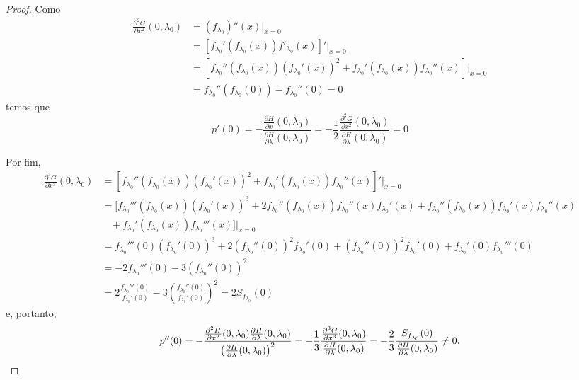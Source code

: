 \begin{proof}
Como
\begin{align*}
\frac{\partial^2 G}{\partial x^2}(0, \lambda_0) & = (f_{\lambda_0})''(x)|_{x = 0} \\
& = [f_{\lambda_0}'(f_{\lambda_0}(x)) f'_{\lambda_0}(x)]'|_{x = 0} \\
& = [f_{\lambda_0}''(f_{\lambda_0}(x))(f_{\lambda_0}'(x))^2 + f_{\lambda_0}'(f_{\lambda_0}(x))f_{\lambda_0}''(x)]|_{x = 0} \\
& = f_{\lambda_0}''(f_{\lambda_0}(0)) - f_{\lambda_0}''(0) = 0
\end{align*} temos que
$$p'(0) = -\frac{\frac{\partial H}{\partial x}(0, \lambda_0) }{\frac{\partial H }{\partial \lambda}(0, \lambda_0)} = -\frac{1}{2} \frac{\frac{\partial^2 G}{\partial x^2}(0, \lambda_0) }{\frac{\partial H }{\partial \lambda}(0, \lambda_0)} = 0$$

Por fim,
\begin{align*}
\frac{\partial^3 G}{\partial x^3}(0, \lambda_0) & = [f_{\lambda_0}''(f_{\lambda_0}(x))(f_{\lambda_0}'(x))^2
+ f_{\lambda_0}'(f_{\lambda_0}(x))f_{\lambda_0}''(x)]'|_{x = 0} \\
& = [f_{\lambda_0}'''(f_{\lambda_0}(x))(f_{\lambda_0}'(x))^3
+ 2f_{\lambda_0}''(f_{\lambda_0}(x))f_{\lambda_0}''(x)f_{\lambda_0}'(x)
+ f_{\lambda_0}''(f_{\lambda_0}(x)) f_{\lambda_0}'(x)f_{\lambda_0}''(x) \\
& \ \ \ \ + f_{\lambda_0}'(f_{\lambda_0}(x))f_{\lambda_0}'''(x)]|_{x = 0} \\
& = f_{\lambda_0}'''(0)(f_{\lambda_0}'(0))^3  + 2(f_{\lambda_0}''(0))^2f_{\lambda_0}'(0) + (f_{\lambda_0}''(0))^2f_{\lambda_0}'(0) + f_{\lambda_0}'(0)f_{\lambda_0}'''(0) \\
& = -2 f_{\lambda_0}'''(0) - 3(f_{\lambda_0}''(0))^2 \\
& = 2\frac{f_{\lambda_0}'''(0)}{f_{\lambda_0}'(0)} - 3\left( \frac{f_{\lambda_0}''(0)}{f_{\lambda_0}'(0)} \right)^2 = 2 S_{f_{\lambda_0}}(0)
\end{align*}
e, portanto,
$$ p''(0) = - \frac{\frac{\partial^2 H}{\partial x^2}(0, \lambda_0)\frac{\partial H}{\partial \lambda}(0, \lambda_0)}{ \left( \frac{ \partial H}{\partial \lambda}(0, \lambda_0) \right)^2} \\
= -\frac{1}{3} \frac{\frac{\partial^3 G}{\partial x^3}(0, \lambda_0)}{\frac{\partial H}{\partial \lambda}(0, \lambda_0)} = -\frac{2}{3} \frac{S_{f_{\lambda_0}}(0)}{\frac{\partial H}{\partial \lambda}(0, \lambda_0)} \neq 0.$$
\end{proof}